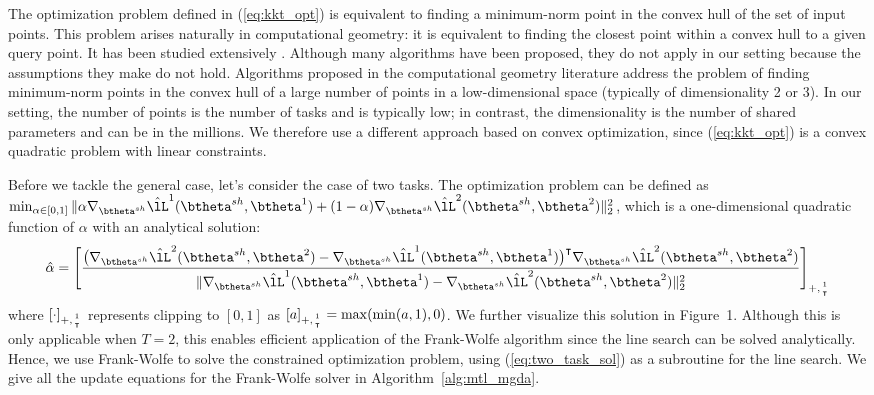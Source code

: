 The optimization problem defined in (\ref{eq:kkt_opt}) is equivalent to finding a minimum-norm point in the convex hull of the set of input points. This problem arises naturally in computational geometry: it is equivalent to finding the closest point within a convex hull to a given query point. It has been studied extensively \citep{Makimoto1994, Wolfe1976, Sekitani1993}. Although many algorithms have been proposed, they do not apply in our setting because the assumptions they make do not hold. Algorithms proposed in the computational geometry literature address the problem of finding minimum-norm points in the convex hull of a large number of points in a low-dimensional space (typically of dimensionality 2 or 3). In our setting, the number of points is the number of tasks and is typically low; in contrast, the dimensionality is the number of shared parameters and can be in the millions. We therefore use a different approach based on convex optimization, since (\ref{eq:kkt_opt}) is a convex quadratic problem with linear constraints.

Before we tackle the general case, let's consider the case of two tasks. The optimization problem can be defined as \mbox{$\min_{\alpha \in [0,1]} \| \alpha \nabla_{\btheta^{sh}}\hat{\lL}^1(\btheta^{sh},\btheta^1)+ (1-\alpha) \nabla_{\btheta^{sh}}\hat{\lL}^2(\btheta^{sh},\btheta^2) \|_2^2$}, which is a one-dimensional quadratic function of $\alpha$ with an analytical solution:
\begin{equation}
\hat{\alpha}= \left[\frac{\big(\nabla_{\btheta^{sh}}\hat{\lL}^2(\btheta^{sh},\btheta^2) - \nabla_{\btheta^{sh}}\hat{\lL}^1(\btheta^{sh},\btheta^1)\big)^\intercal  \nabla_{\btheta^{sh}}\hat{\lL}^2(\btheta^{sh},\btheta^2)  }{\|\nabla_{\btheta^{sh}}\hat{\lL}^1(\btheta^{sh},\btheta^1) - \nabla_{\btheta^{sh}}\hat{\lL}^2(\btheta^{sh},\btheta^2)\|_2^2}\right]_{+,{1 \atop \intercal}}
\label{eq:two_task_sol}
\end{equation}
where $[\cdot]_{+,{1 \atop \intercal}}$ represents clipping to $[0,1]$ as $[a]_{+,{1 \atop \intercal}} = \max(\min(a, 1),0)$. We further visualize this solution in Figure~1. Although this is only applicable when $T=2$, this enables efficient application of the Frank-Wolfe algorithm \citep{Jaggi2013} since the line search can be solved analytically. Hence, we use Frank-Wolfe to solve the constrained optimization problem, using (\ref{eq:two_task_sol}) as a subroutine for the line search. We give all the update equations for the Frank-Wolfe solver in Algorithm~\ref{alg:mtl_mgda}.



